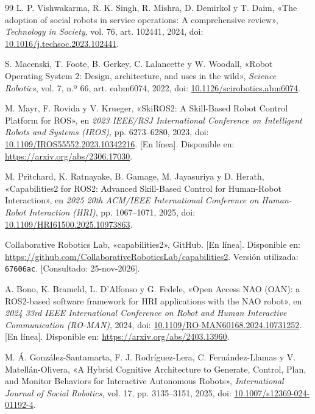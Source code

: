 \documentclass[11pt,letterpaper]{article}
\begin{document}
\FloatBarrier
\clearpage
\renewcommand{\refname}{8. Referencias}
{}
\begin{thebibliography}{99}
 L. P. Vishwakarma, R. K. Singh, R. Mishra, D. Demirkol y T. Daim, «The adoption of social robots in service operations: A comprehensive review», \emph{Technology in Society}, vol. 76, art. 102441, 2024, doi: \href{https://doi.org/10.1016/j.techsoc.2023.102441}{10.1016/j.techsoc.2023.102441}.

 S. Macenski, T. Foote, B. Gerkey, C. Lalancette y W. Woodall, «Robot Operating System 2: Design, architecture, and uses in the wild», \emph{Science Robotics}, vol. 7, n.º 66, art. eabm6074, 2022, doi: \href{https://doi.org/10.1126/scirobotics.abm6074}{10.1126/scirobotics.abm6074}.

 M. Mayr, F. Rovida y V. Krueger, «SkiROS2: A Skill-Based Robot Control Platform for ROS», en \emph{2023 IEEE/RSJ International Conference on Intelligent Robots and Systems (IROS)}, pp. 6273--6280, 2023, doi: \href{https://doi.org/10.1109/IROS55552.2023.10342216}{10.1109/IROS55552.2023.10342216}. [En línea]. Disponible en: \url{https://arxiv.org/abs/2306.17030}.

 M. Pritchard, K. Ratnayake, B. Gamage, M. Jayasuriya y D. Herath, «Capabilities2 for ROS2: Advanced Skill-Based Control for Human-Robot Interaction», en \emph{2025 20th ACM/IEEE International Conference on Human-Robot Interaction (HRI)}, pp. 1067--1071, 2025, doi: \href{https://doi.org/10.1109/HRI61500.2025.10973863}{10.1109/HRI61500.2025.10973863}.

 Collaborative Robotics Lab, «capabilities2», GitHub. [En línea]. Disponible en: \url{https://github.com/CollaborativeRoboticsLab/capabilities2}. Versión utilizada: \texttt{67606ac}. [Consultado: 25-nov-2026].

 A. Bono, K. Brameld, L. D'Alfonso y G. Fedele, «Open Access NAO (OAN): a ROS2-based software framework for HRI applications with the NAO robot», en \emph{2024 33rd IEEE International Conference on Robot and Human Interactive Communication (RO-MAN)}, 2024, doi: \href{https://doi.org/10.1109/RO-MAN60168.2024.10731252}{10.1109/RO-MAN60168.2024.10731252}. [En línea]. Disponible en: \url{https://arxiv.org/abs/2403.13960}.

 M. Á. González-Santamarta, F. J. Rodríguez-Lera, C. Fernández-Llamas y V. Matellán-Olivera, «A Hybrid Cognitive Architecture to Generate, Control, Plan, and Monitor Behaviors for Interactive Autonomous Robots», \emph{International Journal of Social Robotics}, vol. 17, pp. 3135--3151, 2025, doi: \href{https://doi.org/10.1007/s12369-024-01192-4}{10.1007/s12369-024-01192-4}.


\end{thebibliography}
\end{document}
